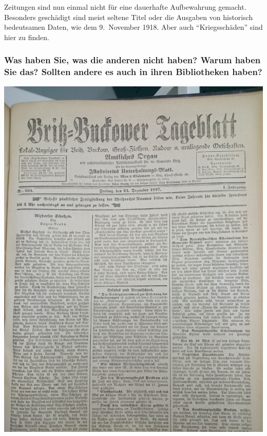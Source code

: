 Zeitungen sind nun einmal nicht für eine dauerhafte Aufbewahrung
gemacht. Besonders geschädigt sind meist seltene Titel oder die Ausgaben
von historisch bedeutsamen Daten, wie dem 9.~November 1918. Aber auch
\enquote{Kriegsschäden} sind hier zu finden.

\hypertarget{was-haben-sie-was-die-anderen-nicht-haben-warum-haben-sie-das-sollten-andere-es-auch-in-ihren-bibliotheken-haben}{%
\subsubsection*{Was haben Sie, was die anderen nicht haben? Warum haben Sie
das? Sollten andere es auch in ihren Bibliotheken
haben?}\label{was-haben-sie-was-die-anderen-nicht-haben-warum-haben-sie-das-sollten-andere-es-auch-in-ihren-bibliotheken-haben}}

\begin{center}
\includegraphics{landesarchiv/img/tageblatt.jpg}
\end{center}

